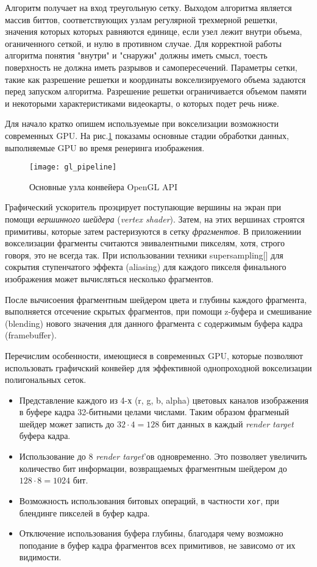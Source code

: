 \documentclass[a4paper,14pt]{extreport}
\begin{document}
Алгоритм получает на вход треугольную сетку. Выходом алгоритма является массив биттов, соответствующих узлам регулярной трехмерной решетки, значения которых которых равняются единице, если узел лежит внутри объема, оганиченного сеткой, и нулю в противном случае. Для корректной работы алгоритма понятия "внутри" и "снаружи" должны иметь смысл, тоесть поверхность не должна иметь разрывов и самопересечений. Параметры сетки, такие как разрешение решетки и координаты вокселизируемого объема задаются перед запуском алгоритма. Разрешение решетки ограничивается объемом памяти и некоторыми характеристиками видеокарты, о которых подет речь ниже.

Для начало кратко опишем используемые при вокселизации возможности современных GPU. На рис.\ref{fig:gl_pipeline} показамы основные стадии обработки данных, выполняемые GPU во время ренеринга изображения.

\begin{figure}[ht]
\center
\texttt{[image: gl\_pipeline]}
\caption{Основные узла конвейера OpenGL API}
\label{fig:gl_pipeline}
\end{figure}

Графический ускоритель проэцирует поступающие вершины на экран при помощи \emph{вершинного шейдера} (\emph{vertex shader}). Затем, на этих вершинах строятся примитивы, которые затем растеризуются в сетку \emph{фрагментов}. В приложениии вокселизации фрагменты считаются эвивалентными пикселям, хотя, строго говоря, это не всегда так. При использовании техники supersampling[] для сокрытия ступенчатого эффекта (aliasing) для каждого пикселя финального изображения может вычисляться несколько фрагментов.

После вычисоения фрагментным шейдером цвета и глубины каждого фрагмента, выполняется отсечение скрытых фрагментов, при помощи z-буфера и смешивание (blending) нового значения для данного фрагмента с содержимым буфера кадра (framebuffer).

Перечислим особенности, имеющиеся в современных GPU, которые позволяют использовать графичский конвейер для эффективной однопроходной вокселизации полигональных сеток.

\begin{itemize}
\item Представление каждого из 4-х (r, g, b, alpha) цветовых каналов изображения в буфере кадра 32-битными целами числами. Таким образом фрагменый шейдер может записть до $32 \cdot 4 = 128$ бит данных в каждый \emph{render target} буфера кадра.
\item Использование до 8 \emph{render target}'ов одновременно. Это позволяет увеличить количество бит информации, возвращаемых фрагментным шейдером до $128 \cdot 8 = 1024$ бит.
\item Возможность использования битовых операций, в частности \texttt{xor}, при блендинге пикселей в буфер кадра.
\item Отключение использования буфера глубины, благодаря чему возможно поподание в буфер кадра фрагментов всех примитивов, не зависомо от их видимости.
\end{itemize}
\end{document}
